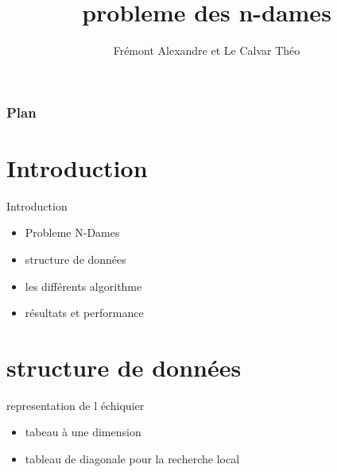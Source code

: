 \documentclass[10pt,a4paper]{beamer}
\author{Frémont Alexandre et Le Calvar Théo}
\title{probleme des n-dames}
\date{\displaydate{date}}
\begin{document}
\begin{frame}
\titlepage
\end{frame}

\begin{frame}
	\frametitle{Plan}
	\tableofcontents[pausesections]

\end{frame}

\section{Introduction}
\begin{frame}

	\begin{block}{Introduction}

	\begin{itemize}
		\item{Probleme N-Dames}

		\item{structure de données}

		\item{les différents algorithme}

		\item{résultats et performance}
	\end{itemize}

	\end{block}

\end{frame}

\section{structure de données}
\begin{frame}


	\begin{block}{representation de l échiquier}
		\begin{itemize}
			\item{tabeau à une dimension}
			\item{tableau de diagonale pour la recherche local}
		\end{itemize}
	\end{block}


\end{frame}
\end{document}

